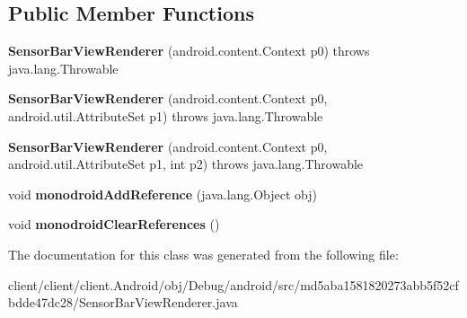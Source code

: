 \subsection*{Public Member Functions}
\begin{DoxyCompactItemize}
\item 
\hypertarget{classmd5aba1581820273abb5f52cfbdde47dc28_1_1SensorBarViewRenderer_aa8d63b4ee51580af498278018293cb15}{}{\bfseries Sensor\+Bar\+View\+Renderer} (android.\+content.\+Context p0)  throws java.\+lang.\+Throwable 	\label{classmd5aba1581820273abb5f52cfbdde47dc28_1_1SensorBarViewRenderer_aa8d63b4ee51580af498278018293cb15}

\item 
\hypertarget{classmd5aba1581820273abb5f52cfbdde47dc28_1_1SensorBarViewRenderer_aa62215d9088b75688a5343f487d2f69b}{}{\bfseries Sensor\+Bar\+View\+Renderer} (android.\+content.\+Context p0, android.\+util.\+Attribute\+Set p1)  throws java.\+lang.\+Throwable 	\label{classmd5aba1581820273abb5f52cfbdde47dc28_1_1SensorBarViewRenderer_aa62215d9088b75688a5343f487d2f69b}

\item 
\hypertarget{classmd5aba1581820273abb5f52cfbdde47dc28_1_1SensorBarViewRenderer_ab15ebbd30b421dea5530795194e090d7}{}{\bfseries Sensor\+Bar\+View\+Renderer} (android.\+content.\+Context p0, android.\+util.\+Attribute\+Set p1, int p2)  throws java.\+lang.\+Throwable 	\label{classmd5aba1581820273abb5f52cfbdde47dc28_1_1SensorBarViewRenderer_ab15ebbd30b421dea5530795194e090d7}

\item 
\hypertarget{classmd5aba1581820273abb5f52cfbdde47dc28_1_1SensorBarViewRenderer_a16355a92a586831d16dfcb2befeb298b}{}void {\bfseries monodroid\+Add\+Reference} (java.\+lang.\+Object obj)\label{classmd5aba1581820273abb5f52cfbdde47dc28_1_1SensorBarViewRenderer_a16355a92a586831d16dfcb2befeb298b}

\item 
\hypertarget{classmd5aba1581820273abb5f52cfbdde47dc28_1_1SensorBarViewRenderer_af2a10743f33d054223e3074c663255f6}{}void {\bfseries monodroid\+Clear\+References} ()\label{classmd5aba1581820273abb5f52cfbdde47dc28_1_1SensorBarViewRenderer_af2a10743f33d054223e3074c663255f6}

\end{DoxyCompactItemize}


The documentation for this class was generated from the following file\+:\begin{DoxyCompactItemize}
\item 
client/client/client.\+Android/obj/\+Debug/android/src/md5aba1581820273abb5f52cfbdde47dc28/Sensor\+Bar\+View\+Renderer.\+java\end{DoxyCompactItemize}
